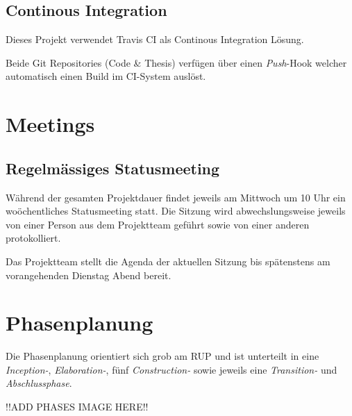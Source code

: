 \subsection{Continous Integration}
Dieses Projekt verwendet Travis CI als Continous Integration Lösung.

Beide Git Repositories (Code \& Thesis) verfügen über einen \emph{Push}-Hook welcher automatisch einen Build im CI-System auslöst.



\section{Meetings}
\subsection{Regelmässiges Statusmeeting}
Während der gesamten Projektdauer findet jeweils am Mittwoch um 10 Uhr ein woöchentliches Statusmeeting statt. Die Sitzung wird abwechslungsweise jeweils von einer Person aus dem Projektteam geführt sowie von einer anderen protokolliert.

Das Projektteam stellt die Agenda der aktuellen Sitzung bis spätenstens am vorangehenden Dienstag Abend bereit.

\section{Phasenplanung}
Die Phasenplanung orientiert sich grob am \gls{RUP} und ist unterteilt in eine \emph{Inception-}, \emph{Elaboration-}, fünf \emph{Construction-} sowie jeweils eine \emph{Transition-} und \emph{Abschlussphase}.


!!ADD PHASES IMAGE HERE!!


